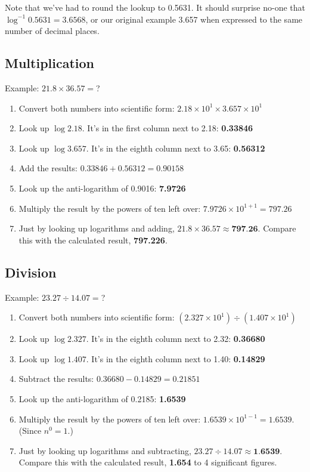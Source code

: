 \documentclass[twoside,a4paper]{article}
\begin{document}
Note that we've had to round the lookup to 0.5631. It should surprise no-one that $\log^{-1}{0.5631} = 3.6568$, or our original example 3.657 when expressed to the same number of decimal places.

\subsection{Multiplication}

Example: $21.8 \times 36.57 = $?
\begin{enumerate}
\item Convert both numbers into scientific form: $2.18 \times 10^1 \times 3.657 \times 10^1$
\item Look up $\log{2.18}$. It's in the first column next to 2.18: \textbf{0.33846}
\item Look up $\log{3.657}$. It's in the eighth column next to 3.65: \textbf{0.56312}
\item Add the results: $0.33846 + 0.56312 = 0.90158$
\item Look up the anti-logarithm of 0.9016: \textbf{7.9726}
\item Multiply the result by the powers of ten left over: $7.9726 \times 10^{1+1} = 797.26$
\item Just by looking up logarithms and adding, $21.8 \times 36.57 \approx \textbf{797.26}$. Compare this with the calculated result, \textbf{797.226}.
\end{enumerate}

\subsection{Division}

Example: $23.27 \div 14.07 =$?
\begin{enumerate}
\item Convert both numbers into scientific form: $(2.327 \times 10^1) \div (1.407 \times 10^1)$
\item Look up $\log{2.327}$. It's in the eighth column next to 2.32: \textbf{0.36680}
\item Look up $\log{1.407}$. It's in the eighth column next to 1.40: \textbf{0.14829}
\item Subtract the results: $0.36680 - 0.14829 = 0.21851$
\item Look up the anti-logarithm of 0.2185: \textbf{1.6539}
\item Multiply the result by the powers of ten left over: $1.6539 \times 10^{1-1} = 1.6539$. (Since $n^0=1$.)
\item Just by looking up logarithms and subtracting, $23.27 \div 14.07 \approx \textbf{1.6539}$. Compare this with the calculated result, \textbf{1.654} to 4 significant figures.
\end{enumerate}
\end{document}
